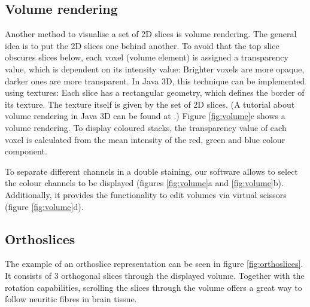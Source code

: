 \documentclass[a4paper,10pt]{article}
\begin{document}
\subsection{Volume rendering}
Another method to visualise a set of 2D slices is volume rendering.
The general idea is to put the 2D slices one behind another. To avoid that the top slice obscures slices below, each voxel (volume element) is assigned a transparency value, which is dependent on its intensity value: Brighter voxels are more opaque, darker ones are more transparent.
In Java 3D, this technique can be implemented using textures: Each slice has a rectangular geometry, which defines the border of its texture. The texture itself is given by the set of 2D slices. (A tutorial about volume rendering in Java 3D can be found at \cite{volrend}.)
Figure \ref{fig:volume}c shows a volume rendering. To display coloured stacks, the transparency value of each voxel is calculated from the mean intensity of the red, green and blue colour component.

To separate different channels in a double staining, our software allows to select the colour channels to be displayed (figures \ref{fig:volume}a and \ref{fig:volume}b). Additionally, it provides the functionality to edit volumes via virtual scissors (figure \ref{fig:volume}d).

\subsection{Orthoslices}
The example of an orthoslice representation can be seen in figure \ref{fig:orthoslices}.
It consists of 3 orthogonal slices through the displayed volume. Together with the rotation capabilities, scrolling the slices through the volume offers a great way to follow neuritic fibres in brain tissue.
\end{document}
